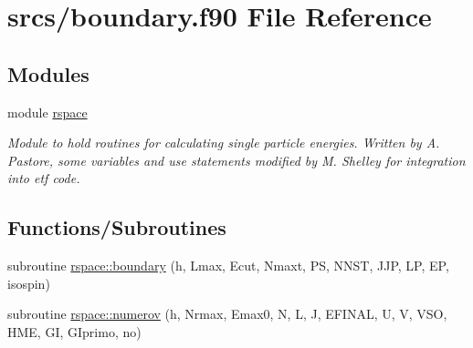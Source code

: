 \hypertarget{boundary_8f90}{}\section{srcs/boundary.f90 File Reference}
\label{boundary_8f90}
\subsection*{Modules}
\begin{DoxyCompactItemize}
\item 
module \mbox{\hyperlink{namespacerspace}{rspace}}
\begin{DoxyCompactList}\small\item\em Module to hold routines for calculating single particle energies. Written by A. Pastore, some variables and use statements modified by M. Shelley for integration into etf code. \end{DoxyCompactList}\end{DoxyCompactItemize}
\subsection*{Functions/\+Subroutines}
\begin{DoxyCompactItemize}
\item 
subroutine \mbox{\hyperlink{namespacerspace_af32fb6df1b49e330db5a70e2b05faa5b}{rspace\+::boundary}} (h, Lmax, Ecut, Nmaxt, PS, N\+N\+ST, J\+JP, LP, EP, isospin)
\item 
subroutine \mbox{\hyperlink{namespacerspace_a95f8e6b75776b923eb4ab9cc71a3be33}{rspace\+::numerov}} (h, Nrmax, Emax0, N, L, J, E\+F\+I\+N\+AL, U, V, V\+SO, H\+ME, GI, G\+Iprimo, no)
\end{DoxyCompactItemize}
